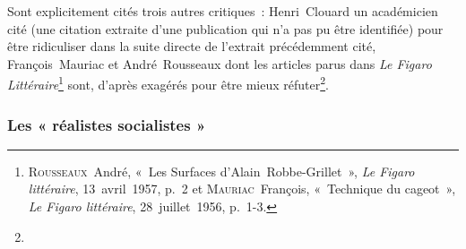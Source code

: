 \documentclass[12pt, a4paper]{article}
\begin{document}
Sont explicitement cités trois autres critiques~: Henri~Clouard un académicien cité (une citation extraite d'une publication qui n'a pas pu être identifiée) pour être ridiculiser dans la suite directe de l'extrait précédemment cité, François~Mauriac et André~Rousseaux dont les articles parus dans \textit{Le Figaro Littéraire}\footnote{\textsc{Rousseaux}~André, «~Les Surfaces d’Alain~Robbe-Grillet~», \textit{Le Figaro littéraire}, 13~avril~1957, p.~2 et \textsc{Mauriac}~François, «~Technique du cageot~», \textit{Le Figaro littéraire}, 28~juillet~1956, p.~1-3.} sont, d'après \galia{} exagérés pour être mieux réfuter\footnote{}. 


\subsubsection{Les « réalistes socialistes »}
\end{document}

